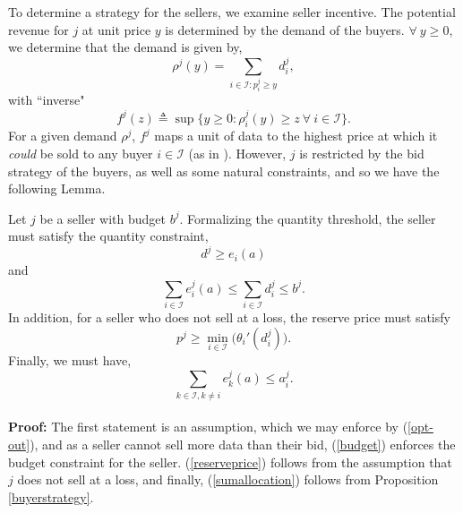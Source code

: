 \documentclass[12pt]{article}
\theoremstyle{definition}
\newcommand{\mcI}{\mathcal{I}}
\begin{document}
\begin{multicols}{2}
To determine a strategy for the sellers, we examine seller incentive. The potential revenue for $j$ at unit price $y$ is determined by the
demand of the buyers. $\forall \ y\ge 0$, we determine that the demand is given by,
\begin{equation}\label{datademand}
    \rho^j(y) = \sum_{i\in\mcI : p_i^j\ge y} d_i^j, 
\end{equation}
with ``inverse"
\begin{equation}\label{revenue}
    f^j(z) \triangleq \sup\big\lbrace y\ge 0:
        \rho_i^j(y) \ge z \ \forall \ i \in \mcI\big\rbrace.
\end{equation}
For a given demand $\rho^j$, $f^j$ maps a unit of data to the highest price at
which it \emph{could} be sold to any buyer $i\in \mcI$ (as in \cite{semret}). However, $j$ is restricted by
the bid strategy of the buyers, as well as some natural constraints, and so we have the following Lemma.

{
\label{constraints}
Let $j$ be a seller with budget $b^j$.
Formalizing the quantity threshold, the seller must satisfy the quantity
constraint, 
\begin{equation}\label{quantity}
    d^j \ge e_i(a)
\end{equation}
and
\begin{equation}\label{budget}
    \displaystyle\sum_{i\in\mcI} e_i^j(a) \le \sum_{i\in\mcI} d^j_i \le b^j.
\end{equation}
In addition, for a seller who does not sell at a loss, the reserve price must
satisfy 
\begin{equation}\label{reserveprice}
   p^j \ge \min_{i\in\mcI}\big({\theta_i}'(d_i^j)\big).
\end{equation}
Finally, we must have,
\begin{equation}\label{sumallocation}
    \displaystyle\sum_{k\in \mcI, k\ne i} e_k^j(a) \le a_i^j.
\end{equation}
}\\
\textbf{Proof:}
The first statement is an assumption, which we may enforce by (\ref{opt-out}),
and as a seller cannot sell more data than their bid, (\ref{budget}) enforces
the budget constraint for the seller. (\ref{reserveprice})
follows from the assumption that $j$ does not sell at a loss, and finally, (\ref{sumallocation})
follows from Proposition \ref{buyerstrategy}. 


\end{multicols}
\end{document}
